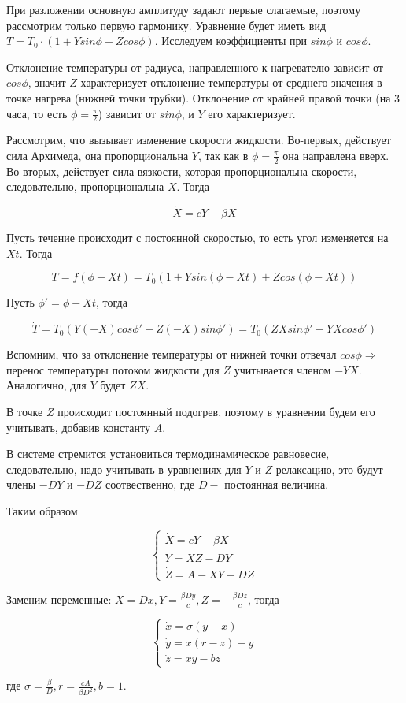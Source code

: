 \documentclass[12pt]{article}
\begin{document}
При разложении основную амплитуду задают первые слагаемые, поэтому рассмотрим только первую гармонику. Уравнение будет иметь вид $T = T_0 \cdot (1+Ysin\phi + Zcos\phi)$. Исследуем коэффициенты при $sin\phi$ и $cos\phi$.

Отклонение температуры от радиуса, направленного к нагревателю зависит от $cos \phi$, значит $Z$ характеризует отклонение температуры от среднего значения в точке нагрева (нижней точки трубки). Отклонение от крайней правой точки (на 3 часа, то есть $\phi = \frac{\pi}{2}$) зависит от $sin\phi$, и $Y$ его характеризует.

Рассмотрим, что вызывает изменение скорости жидкости. Во-первых, действует сила Архимеда, она пропорциональна $Y$, так как в $\phi=\frac{\pi}{2}$ она направлена вверх. Во-вторых, действует сила вязкости, которая пропорциональна скорости, следовательно, пропорциональна $X$. Тогда

\begin{equation}
	\dot{X} = cY-\beta X
\end{equation}

Пусть течение происходит с постоянной скоростью, то есть угол изменяется на $Xt$. Тогда

\begin{equation}
	T=f(\phi-Xt)=T_0(1+Ysin(\phi-Xt)+Zcos(\phi-Xt))
\end{equation}

Пусть $\phi'=\phi-Xt$, тогда

\begin{equation}
	\dot{T}=T_0(Y(-X)cos\phi'-Z(-X)sin\phi')=T_0(ZXsin\phi'-YXcos\phi')
\end{equation}

Вспомним, что за отклонение температуры от нижней точки отвечал $cos\phi \Longrightarrow$ перенос температуры потоком жидкости для $Z$ учитывается членом $-YX$. Аналогично, для $Y$ будет $ZX$.

В точке $Z$ происходит постоянный подогрев, поэтому в уравнении будем его учитывать, добавив константу $A$. 

В системе стремится установиться термодинамическое равновесие, следовательно, надо учитывать в уравнениях для $Y$ и $Z$ релаксацию, это будут члены $-DY$ и $-DZ$ соотвественно, где $D -$ постоянная величина.

Таким образом

$$\begin{cases}
	\dot{X} = cY-\beta X \\
	\dot{Y} = XZ-DY \\
	\dot{Z} = A-XY-DZ
\end{cases}$$

Заменим переменные: $X=Dx, Y=\frac{\beta Dy}{c}, Z=-\frac{\beta Dz}{c}$, тогда

$$\begin{cases}	
	\dot{x} = \sigma (y-x) \\
	\dot{y} = x(r-z)-y \\
	\dot{z} = xy-bz
\end{cases}$$

где $\sigma = \frac{\beta}{D}, r=\frac{cA}{\beta D^2}, b=1$.
\end{document}

